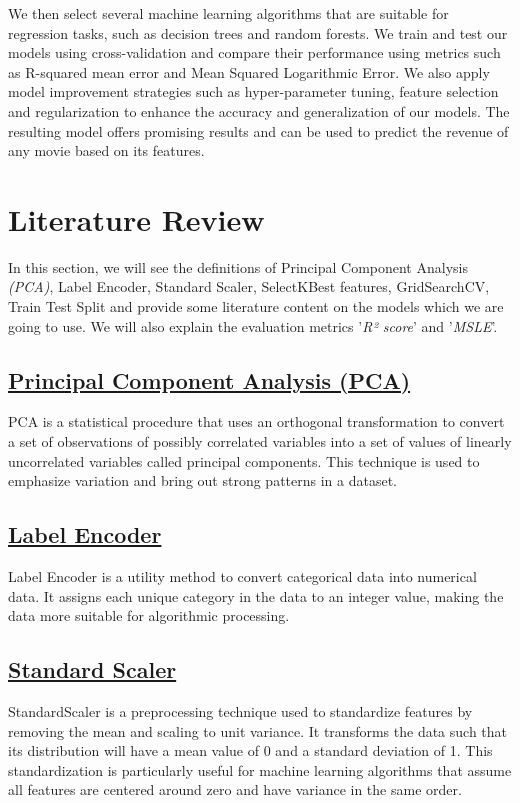 \documentclass[conference]{IEEEtran}
\begin{document}
        We then select several machine learning algorithms that are suitable for regression tasks, such as decision trees and random forests. We train and test our models using cross-validation and compare their performance using metrics such as R-squared mean error and Mean Squared Logarithmic Error. We also apply model improvement strategies such as hyper-parameter tuning, feature selection and regularization to enhance the accuracy and generalization of our models. The resulting model offers promising results and can be used to predict the revenue of any movie based on its features.

\section{Literature Review}
    In this section, we will see the definitions of Principal Component Analysis \textit{(PCA)}, Label Encoder, Standard Scaler, SelectKBest features, GridSearchCV, Train Test Split and provide some literature content on the models which we are going to use. We will also explain the evaluation metrics '\textit{R² score}' and '\textit{MSLE}'.

    \subsection*{\href{https://en.wikipedia.org/wiki/Principal_component_analysis}{Principal Component Analysis (PCA)}}
    PCA is a statistical procedure that uses an orthogonal transformation to convert a set of observations of possibly correlated variables into a set of values of linearly uncorrelated variables called principal components. This technique is used to emphasize variation and bring out strong patterns in a dataset.

    \subsection*{\href{https://scikit-learn.org/stable/modules/generated/sklearn.preprocessing.LabelEncoder.html}{Label Encoder}}
    Label Encoder is a utility method to convert categorical data into numerical data. It assigns each unique category in the data to an integer value, making the data more suitable for algorithmic processing.

    \subsection*{\href{https://scikit-learn.org/stable/modules/generated/sklearn.preprocessing.StandardScaler.html}{Standard Scaler}}
    StandardScaler is a preprocessing technique used to standardize features by removing the mean and scaling to unit variance. It transforms the data such that its distribution will have a mean value of 0 and a standard deviation of 1. This standardization is particularly useful for machine learning algorithms that assume all features are centered around zero and have variance in the same order.
\end{document}
